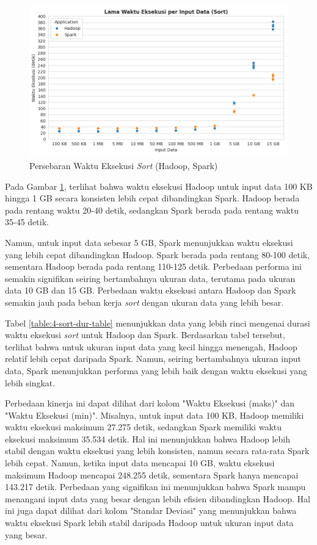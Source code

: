 \begin{figure}[h]
    \centering
    \includegraphics[width=1\textwidth]{figures/ch04/1-lama-waktu-eksekusi-sort.png}
    \caption{Persebaran Waktu Eksekusi \textit{Sort} (Hadoop, Spark)}
    \label{fig:lama-waktu-eksekusi-sort}
\end{figure}

Pada Gambar \ref{fig:lama-waktu-eksekusi-sort}, terlihat bahwa waktu eksekusi Hadoop untuk input data 100 KB hingga 1 GB secara konsisten lebih cepat dibandingkan Spark. Hadoop berada pada rentang waktu 20-40 detik, sedangkan Spark berada pada rentang waktu 35-45 detik.

Namun, untuk input data sebesar 5 GB, Spark menunjukkan waktu eksekusi yang lebih cepat dibandingkan Hadoop. Spark berada pada rentang 80-100 detik, sementara Hadoop berada pada rentang 110-125 detik. Perbedaan performa ini semakin signifikan seiring bertambahnya ukuran data, terutama pada ukuran data 10 GB dan 15 GB. Perbedaan waktu eksekusi antara Hadoop dan Spark semakin jauh pada beban kerja \textit{sort} dengan ukuran data yang lebih besar.

Tabel \ref{table:4-sort-dur-table} menunjukkan data yang lebih rinci mengenai durasi waktu eksekusi \textit{sort} untuk Hadoop dan Spark. Berdasarkan tabel tersebut, terlihat bahwa untuk ukuran input data yang kecil hingga menengah, Hadoop relatif lebih cepat daripada Spark. Namun, seiring bertambahnya ukuran input data, Spark menunjukkan performa yang lebih baik dengan waktu eksekusi yang lebih singkat.

Perbedaan kinerja ini dapat dilihat dari kolom "Waktu Eksekusi (maks)" dan "Waktu Eksekusi (min)". Misalnya, untuk input data 100 KB, Hadoop memiliki waktu eksekusi maksimum 27.275 detik, sedangkan Spark memiliki waktu eksekusi maksimum 35.534 detik. Hal ini menunjukkan bahwa Hadoop lebih stabil dengan waktu eksekusi yang lebih konsisten, namun secara rata-rata Spark lebih cepat. Namun, ketika input data mencapai 10 GB, waktu eksekusi maksimum Hadoop mencapai 248.255 detik, sementara Spark hanya mencapai 143.217 detik. Perbedaan yang signifikan ini menunjukkan bahwa Spark mampu menangani input data yang besar dengan lebih efisien dibandingkan Hadoop. Hal ini juga dapat dilihat dari kolom "Standar Deviasi" yang menunjukkan bahwa waktu eksekusi Spark lebih stabil daripada Hadoop untuk ukuran input data yang besar.

